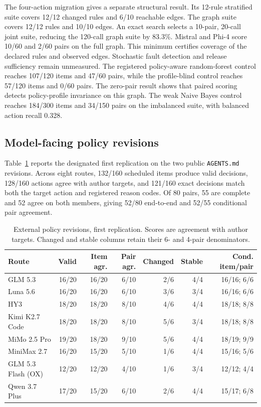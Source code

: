 \documentclass[10pt]{article}
\begin{document}
The four-action migration gives a separate structural result. Its 12-rule stratified suite
covers 12/12 changed rules and 6/10 reachable edges. The graph suite covers 12/12 rules and 10/10
edges. An exact search selects a 10-pair, 20-call joint suite, reducing the 120-call graph suite by
83.3\%. Mistral and Phi-4 score 10/60 and 2/60 pairs on the full graph. This minimum certifies
coverage of the declared rules and observed edges. Stochastic fault detection and release
sufficiency remain unmeasured. The registered policy-aware random-forest control reaches
107/120 items and 47/60 pairs, while the profile-blind control reaches 57/120 items and 0/60 pairs.
The zero-pair result shows that paired scoring detects policy-profile invariance on this graph. The
weak Naive Bayes control reaches 184/300 items and 34/150 pairs on the imbalanced suite, with
balanced action recall 0.328.

\subsection{Model-facing policy revisions}

Table~\ref{tab:external-routes} reports the designated first replication on the two public
\texttt{AGENTS.md} revisions. Across eight routes, 132/160 scheduled items produce valid decisions,
128/160 actions agree with author targets, and 121/160 exact decisions match both the target action
and registered reason codes. Of 80 pairs, 55 are complete and 52 agree on both members, giving
52/80 end-to-end and 52/55 conditional pair agreement.

\begin{table}[H]
\centering
\scriptsize
\setlength{\tabcolsep}{2.6pt}
\caption{External policy revisions, first replication. Scores are agreement with author targets.
Changed and stable columns retain their 6- and 4-pair denominators.}
\label{tab:external-routes}
\begin{tabular}{@{}lrrrrrr@{}}
\toprule
Route & Valid & Item agr. & Pair agr. & Changed & Stable & Cond. item/pair \\
\midrule
GLM 5.3 & 16/20 & 16/20 & 6/10 & 2/6 & 4/4 & 16/16; 6/6 \\
Luna 5.6 & 16/20 & 16/20 & 6/10 & 3/6 & 3/4 & 16/16; 6/6 \\
HY3 & 18/20 & 18/20 & 8/10 & 4/6 & 4/4 & 18/18; 8/8 \\
Kimi K2.7 Code & 18/20 & 18/20 & 8/10 & 5/6 & 3/4 & 18/18; 8/8 \\
MiMo 2.5 Pro & 19/20 & 18/20 & 9/10 & 5/6 & 4/4 & 18/19; 9/9 \\
MiniMax 2.7 & 16/20 & 15/20 & 5/10 & 1/6 & 4/4 & 15/16; 5/6 \\
GLM 5.3 Flash (OX) & 12/20 & 12/20 & 4/10 & 1/6 & 3/4 & 12/12; 4/4 \\
Qwen 3.7 Plus & 17/20 & 15/20 & 6/10 & 2/6 & 4/4 & 15/17; 6/8 \\
\bottomrule
\end{tabular}
\end{table}
\end{document}
